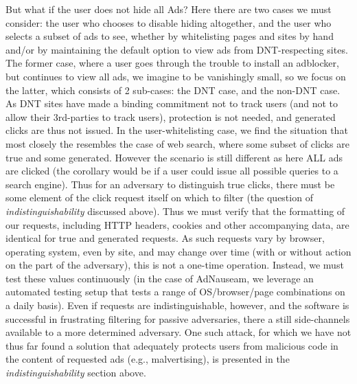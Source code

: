 \documentclass[conference]{IEEEtran}
\begin{document}
But what if the user does not hide all Ads? Here there are two cases we must consider: the user who chooses to disable hiding altogether, and the user who selects a subset of ads to see, whether by whitelisting pages and sites by hand and/or by maintaining the default option to view ads from DNT-respecting sites. The former case, where a user goes through the trouble to install an adblocker, but continues to view all ads, we imagine to be vanishingly small, so we focus on the latter, which consists of 2 sub-cases: the DNT case, and the non-DNT case. As DNT sites have made a binding commitment not to track users (and not to allow their 3rd-parties to track users), protection is not needed, and generated clicks are thus not issued. In the user-whitelisting case, we find the situation that most closely the resembles the case of web search, where some subset of clicks are true and some generated. However the scenario is still different as here ALL ads are clicked (the corollary would be if a user could issue all possible queries to a search engine). Thus for an adversary to distinguish true clicks, there must be some element of the click request itself on which to filter (the question of \emph{indistinguishability} discussed above). Thus we must verify that the formatting of our requests, including HTTP headers, cookies and other accompanying data, are identical for true and generated requests. As such requests vary by browser, operating system, even by site, and may change over time (with or without action on the part of the adversary), this is not a one-time operation. Instead, we must test these values continuously (in the case of AdNauseam, we leverage an automated testing setup that tests a range of OS/browser/page combinations on a daily basis). Even if requests are indistinguishable, however, and the software is successful in frustrating filtering for passive adversaries, there a still side-channels available to a more determined adversary. One such attack, for which we have not thus far found a solution that adequately protects users from malicious code in the content of requested ads (e.g., malvertising), is presented in the \emph{indistinguishability} section above.
\end{document}
